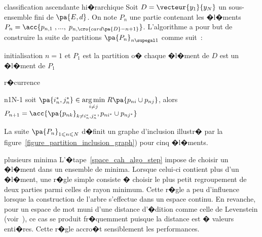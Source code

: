             \begin{xalgorithm}{classification ascendante hi�rarchique}\label{algorithm_AHC}%
            Soit $D= \vecteur{y_1}{y_N}$ un sous-ensemble fini de $\pa{E,d}$. On note $P_n$
            une partie contenant les �l�ments $P_n = \acc{p_{n,1} \; , ... , \; p_{n, \cro{card\pa{D}-n+1}}}$.
            L'algorithme a pour but de construire la suite de partitions $\pa{P_n}_{n \supegal 1}$ comme suit~:
            
            \begin{xalgostep}{initialisation}
                $n = 1$ et $P_1$ est la partition o� chaque �l�ment de $D$ est un �l�ment de $P_1$
            \end{xalgostep}
            
            \begin{xalgostep}{r�currence}\label{space_cah_algo_step}
                \begin{xfor}{n}{1}{N-1}
                    soit $\pa{i^*_n,j^*_n} \in \underset{ i \neq j }{\arg \min} \; R\pa{p_{ni} \cup p_{nj} }$, alors
                    $P_{n+1} = \acc{ \pa{p_{nk}}_{k \neq i^*_n,j^*_n}, p_{ni^*} \cup p_{nj^*} }$
                \end{xfor}
            \end{xalgostep}
            
            \end{xalgorithm}



La suite $\pa{P_n}_{1 \leqslant n \leqslant N}$ d�finit un graphe d'inclusion illustr� par la
figure~\ref{figure_partition_inclusion_graph}) pour cinq �l�ments.\\









\begin{xremark}{plusieurs minima}
L'�tape~\ref{space_cah_algo_step} impose de choisir un �l�ment dans un ensemble de minima. Lorsque celui-ci contient plus d'un �l�ment, une r�gle simple consiste � choisir le plus petit regroupement de deux parties parmi celles de rayon minimum. Cette r�gle a peu d'influence lorsque la construction de l'arbre s'effectue dans un espace continu. En revanche, pour un espace de mot muni d'une distance d'�dition comme celle de Levenstein (voir~), ce cas se produit fr�quemment puisque la distance est � valeurs enti�res. Cette r�gle accro�t sensiblement les performances.
\end{xremark}



